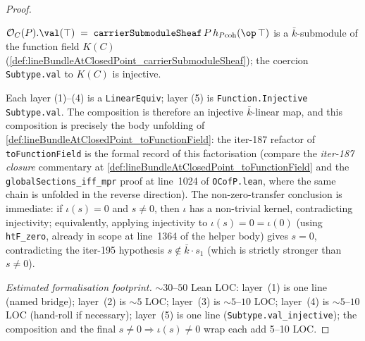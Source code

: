\begin{proof}
\begin{enumerate}
      \(\mathcal O_C(P).\val(\top) \;=\;
      \texttt{carrierSubmoduleSheaf}\,P\,h_{P\mathrm{coh}}(\op\,\top)\)
      is a \(\bar k\)-submodule of the function field \(K(C)\)
      (\cref{def:lineBundleAtClosedPoint_carrierSubmoduleSheaf}); the
      coercion \texttt{Subtype.val} to \(K(C)\) is injective.
  \end{enumerate}
  Each layer (1)--(4) is a \texttt{LinearEquiv}; layer (5) is
  \texttt{Function.Injective Subtype.val}. The composition is therefore
  an injective \(\bar k\)-linear map, and this composition is precisely
  the body unfolding of
  \cref{def:lineBundleAtClosedPoint_toFunctionField}: the iter-187
  refactor of \texttt{toFunctionField} is the formal record of this
  factorisation (compare the \emph{iter-187 closure} commentary at
  \cref{def:lineBundleAtClosedPoint_toFunctionField} and the
  \texttt{globalSections\_iff\_mpr} proof at line~1024 of
  \texttt{OCofP.lean}, where the same chain is unfolded in the
  reverse direction). The non-zero-transfer conclusion is immediate:
  if \(\iota(s)=0\) and \(s\ne 0\), then \(\iota\) has a non-trivial
  kernel, contradicting injectivity; equivalently, applying
  injectivity to \(\iota(s)=0=\iota(0)\) (using
  \texttt{htF\_zero}, already in scope at line~1364 of the helper
  body) gives \(s=0\), contradicting the iter-195 hypothesis
  \(s\notin \bar k\cdot s_1\) (which is strictly stronger than
  \(s\ne 0\)).

  \emph{Estimated formalisation footprint.} \(\sim 30\)--\(50\)
  Lean LOC: layer~(1) is one line (named bridge); layer~(2) is
  \(\sim 5\) LOC; layer~(3) is \(\sim 5\)--\(10\) LOC; layer~(4) is
  \(\sim 5\)--\(10\) LOC (hand-roll if necessary); layer~(5) is one
  line (\texttt{Subtype.val\_injective}); the composition and the
  final \(s\ne 0\Rightarrow\iota(s)\ne 0\) wrap each add 5--10 LOC.
\end{proof}

